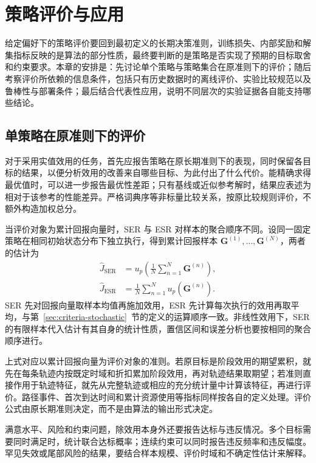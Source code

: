 \section{策略评价与应用}\label{sec:evaluation}

给定偏好下的策略评价要回到最初定义的长期决策准则，训练损失、内部奖励和解集指标反映的是算法的部分性质，最终要判断的是策略是否实现了预期的目标取舍和约束要求。本章的安排是：先讨论单个策略与策略集合在原准则下的评价；随后考察评价所依赖的信息条件，包括只有历史数据时的离线评价、实验比较规范以及鲁棒性与部署条件；最后结合代表性应用，说明不同层次的实验证据各自能支持哪些结论。

\subsection{单策略在原准则下的评价}\label{sec:eval-criteria}

对于采用实值效用的任务，首先应报告策略在原长期准则下的表现，同时保留各目标的结果，以便分析效用的改善来自哪些目标、为此付出了什么代价。能精确求得最优值时，可以进一步报告最优性差距；只有基线或近似参考解时，结果应表述为相对于该参考的性能差异。严格词典序等非标量比较关系，按原比较规则评价，不额外构造加权总分。

当评价对象为累计回报向量时，SER 与 ESR 对样本的聚合顺序不同。设同一固定策略在相同初始状态分布下独立执行，得到累计回报样本 \(\mathbf G^{(1)},\ldots,\mathbf G^{(N)}\)，两者的估计为
\begin{equation}
\begin{aligned}
\widehat J_{\mathrm{SER}}
&=
u_p\!\left(
\frac{1}{N}
\sum_{n=1}^{N}\mathbf G^{(n)}
\right),\\
\widehat J_{\mathrm{ESR}}
&=
\frac{1}{N}
\sum_{n=1}^{N}
u_p\!\left(\mathbf G^{(n)}\right).
\end{aligned}
\end{equation}
SER 先对回报向量取样本均值再施加效用，ESR 先计算每次执行的效用再取平均，与第~\ref{sec:criteria-stochastic}~节的定义的运算顺序一致\cite{hayes2022}。非线性效用下，SER 的有限样本代入估计有其自身的统计性质，置信区间和误差分析也要按相同的聚合顺序进行。

上式对应以累计回报向量为评价对象的准则。若原目标是阶段效用的期望累积，就先在每条轨迹内按既定时域和折扣累加阶段效用，再对轨迹结果取期望；若准则直接作用于轨迹特征，就先从完整轨迹或相应的充分统计量中计算该特征，再进行评价。路径事件、首次到达时间和累计资源使用等指标同样按各自的定义处理。评价公式由原长期准则决定，而不是由算法的输出形式决定。

满意水平、风险和约束问题，除效用本身外还要报告达标与违反情况。多个目标需要同时满足时，统计联合达标概率；连续约束可以同时报告违反频率和违反幅度。罕见失效或尾部风险的结果，要结合样本规模、评价时域和不确定性估计来解释。

